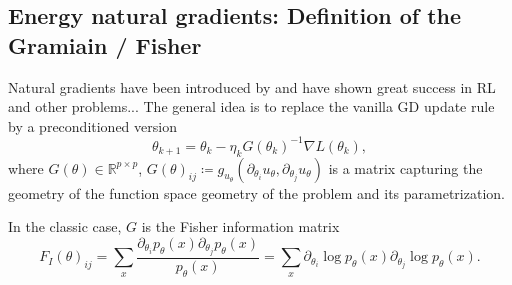 \subsection{Energy natural gradients: Definition of the Gramiain / Fisher}


Natural gradients have been introduced by \citet{amari2000natural} and have shown great success in RL and other problems...
The general idea is to replace the vanilla GD update rule by a preconditioned version
    \[ \theta_{k+1} = \theta_k - \eta_k G(\theta_k)^{-1} \nabla L(\theta_k), \]
where $G(\theta)\in\mathbb R^{p\times p}$, $G(\theta)_{ij} \coloneqq g_{u_\theta}(\partial_{\theta_i} u_\theta, \partial_{\theta_j} u_\theta)$ is a matrix capturing the geometry of the function space geometry of the problem and its parametrization.

In the classic case, $G$ is the Fisher information matrix
\begin{equation}
    F_I(\theta)_{ij} = \sum_{x} \frac{\partial_{\theta_i}p_\theta(x)\partial_{\theta_j}p_\theta(x)}{p_\theta(x)} = \sum_{x} \partial_{\theta_i} \log p_\theta(x) \partial_{\theta_j} \log p_\theta(x).
\end{equation}


